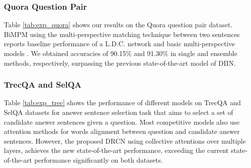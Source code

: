 \documentclass[letterpaper]{article} \usepackage{aaai19}  \usepackage{times}  \usepackage{helvet}  \usepackage{courier}  \usepackage{url}  \usepackage{graphicx}  \frenchspacing  \setlength{\pdfpagewidth}{8.5in}  \setlength{\pdfpageheight}{11in}
\begin{document}
\subsubsection{Quora Question Pair}

Table \ref{tab:exp_quora} shows our results on the Quora question pair dataset. BiMPM using the multi-perspective matching technique between two sentences reports baseline performance of a L.D.C. network and basic multi-perspective models \cite{wang2017bilateral}. We obtained accuracies of 90.15\% and 91.30\% in single and ensemble methods, respectively, surpassing the previous state-of-the-art model of DIIN.



\subsubsection{TrecQA and SelQA}

Table \ref{tab:exp_trec} shows the performance of different models on
TrecQA and SelQA datasets for answer sentence selection task that aims to select a set of candidate answer sentences given a question. Most competitive models \cite{shen2017inter,bian2017compare,wang2017bilateral,shen2017adaptive} also use attention methods for words alignment between question and candidate answer sentences. However, the proposed DRCN using collective attentions over multiple layers, achieves the new state-of-the-art performance, exceeding the current state-of-the-art performance significantly on both datasets.
\end{document}
